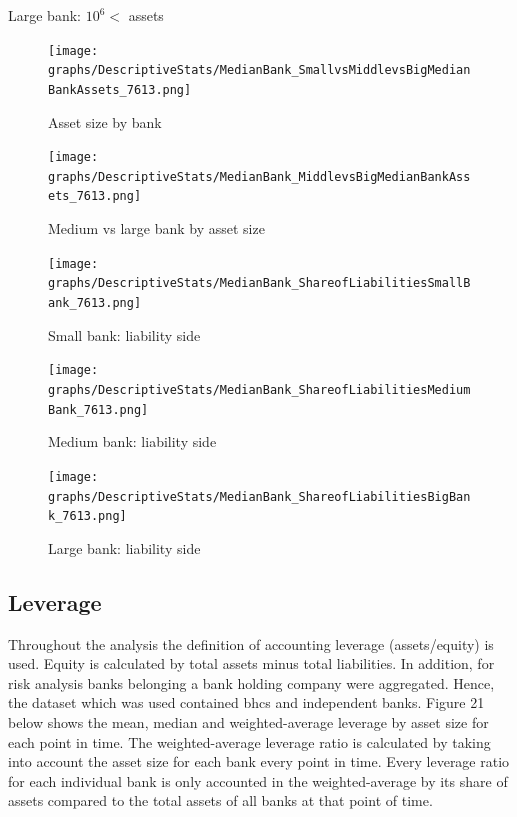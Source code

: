 \documentclass[12pt, a4paper]{article} %
\begin{document}
Large bank: $10^6<$ assets 

\begin{figure}[hbtp]
\centering
\caption{Asset size by bank}
\texttt{[image: graphs/DescriptiveStats/MedianBank\_SmallvsMiddlevsBigMedianBankAssets\_7613.png]}
\end{figure}

\begin{figure}[hbtp]
\centering
\caption{Medium vs large bank by asset size}
\texttt{[image: graphs/DescriptiveStats/MedianBank\_MiddlevsBigMedianBankAssets\_7613.png]}
\end{figure}


\begin{figure}[hbtp]
\centering
\caption{Small bank: liability side}
\texttt{[image: graphs/DescriptiveStats/MedianBank\_ShareofLiabilitiesSmallBank\_7613.png]}
\end{figure}


\begin{figure}[hbtp]
\centering
\caption{Medium bank: liability side}
\texttt{[image: graphs/DescriptiveStats/MedianBank\_ShareofLiabilitiesMediumBank\_7613.png]}
\end{figure}


\begin{figure}[hbtp]
\centering
\caption{Large bank: liability side}
\texttt{[image: graphs/DescriptiveStats/MedianBank\_ShareofLiabilitiesBigBank\_7613.png]}
\end{figure}



\newpage

\subsection{Leverage}

Throughout the analysis the definition of accounting leverage (assets/equity) is used. Equity is calculated by total assets minus total liabilities. In addition, for risk analysis banks belonging a bank holding company were aggregated. Hence, the dataset which was used contained bhcs and independent banks. Figure 21 below shows the mean, median and weighted-average leverage by asset size for each point in time. The weighted-average leverage ratio is calculated by taking into account the asset size for each bank every point in time. Every leverage ratio for each individual bank is only accounted in the weighted-average by its share of assets compared to the total assets of all banks at that point of time.
\end{document}
